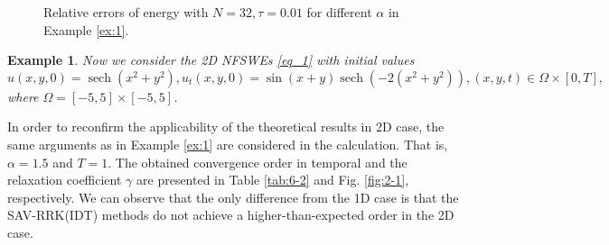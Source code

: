 \documentclass[preprint,compress,3p,10pt,fleqn]{elsarticle}
\numberwithin{equation}{section}
\newtheorem{expl}{Example}[section]
\newenvironment{example}{\begin{expl}\rm}{\end{expl}}
\begin{document}
\begin{figure}[H]
\begin{center}
{}\caption{ Relative errors of energy with $N=32, \tau=0.01$ for different $\alpha$ in Example \ref{ex:1}.}
\label{fig:4}
\end{center}
\end{figure}
	
\begin{example}\label{ex:2}
Now we consider the 2D NFSWEs \eqref{eq_1} with initial values
\begin{equation*}
u(x, y, 0)=\operatorname{sech}\left(x^2+y^2\right), u_t(x, y, 0)=\sin (x+y) \operatorname{sech}\left(-2\left(x^2+y^2\right)\right),(x, y, t) \in \Omega \times[0, T],
\end{equation*}
where $\Omega=[-5,5] \times[-5,5]$.
\end{example}
	
	
In order to reconfirm the applicability of the theoretical results in 2D case,
the same arguments as in Example \ref{ex:1} are considered in the calculation.
That is, $\alpha=1.5$ and $T=1$.  The obtained convergence order in temporal and
the relaxation coefficient $\gamma$ are presented in Table \ref{tab:6-2} and
Fig. \ref{fig:2-1}, respectively. We can observe that the only difference from the 1D case is that the SAV-RRK(IDT) methods do not achieve a higher-than-expected
order in the 2D case.
	
\end{document}
